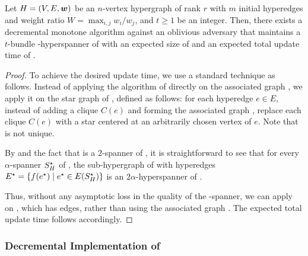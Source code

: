 \begin{lemma} \label{lem:decremental_t-bundle}
Let \( { H} = (V, E, \boldsymbol{w}) \) be an \( n \)-vertex hypergraph of rank \( r \) with \( m \) initial hyperedges and weight ratio \( W = \max _{i,j} w_i / w_j \), and \( t \geq 1 \) be an integer.
Then, there exists a decremental monotone algorithm against an oblivious adversary that maintains a \( t \)-bundle -hyperspanner  of  with an expected size of  and an expected total update time of .
\end{lemma}
\begin{proof}
To achieve the desired update time,
we use a standard technique as follows.
Instead of applying the algorithm of  directly on the associated graph , we apply it on the star graph  of , defined as follows: for each hyperedge \( e \in E \), instead of adding a clique \( C(e) \) and forming the associated graph , replace each clique \( C(e) \) with a star centered at an arbitrarily chosen vertex of \( e \).
Note that  is not unique.

By  and the fact that  is a \( 2 \)-spanner of , it is straightforward to see that for every \( \alpha \)-spanner \( S_{ H}^\star \) of , the sub-hypergraph  of  with hyperedges \( E^\star = \{ f(e^\star) \mid e^\star \in E(S_{ H}^\star) \} \) is an \( 2 \alpha \)-hyperspanner of .

Thus, without any asymptotic loss in the quality of the -spanner, we can apply  on , which has  edges, rather than using the associated graph .
The expected total update time follows accordingly.
\end{proof}



\subsubsection{Decremental Implementation of } \label{subsec:decremetal_light_spectral_sparsify}

